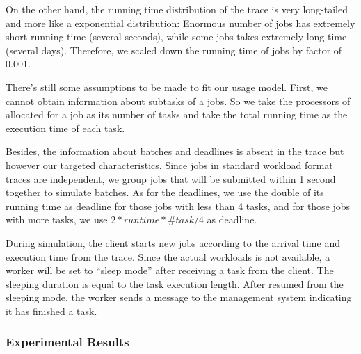 On the other hand, the running time distribution of the trace is very
long-tailed and more like a exponential distribution: Enormous number of
jobs has extremely short running time (several seconds), while some jobs
takes extremely long time (several days).
Therefore, we scaled down the running time of jobs by factor of 0.001.

There's still some assumptions to be made to fit our usage model.
First, we cannot obtain information about subtasks of a jobs.
So we take the processors of allocated for a job as its number of tasks
and take the total running time as the execution time of each task.

Besides, the information about batches and deadlines is absent in the
trace but however our targeted characteristics.
Since jobs in standard workload format traces are independent,
we group jobs that will be submitted within 1 second together to
simulate batches.
As for the deadlines, we use the double of its running time as deadline
for those jobs with less than 4 tasks, and for those jobs with more
tasks, we use $2 * runtime * \#task / 4$ as deadline.

During simulation, the client starts new jobs according to the arrival
time and execution time from the trace.
Since the actual workloads is not available, a worker will be set to
``sleep mode'' after receiving a task from the client.
The sleeping duration is equal to the task execution length.
After resumed from the sleeping mode, the worker sends a message to the
management system indicating it has finished a task.


\subsubsection{Experimental Results}



